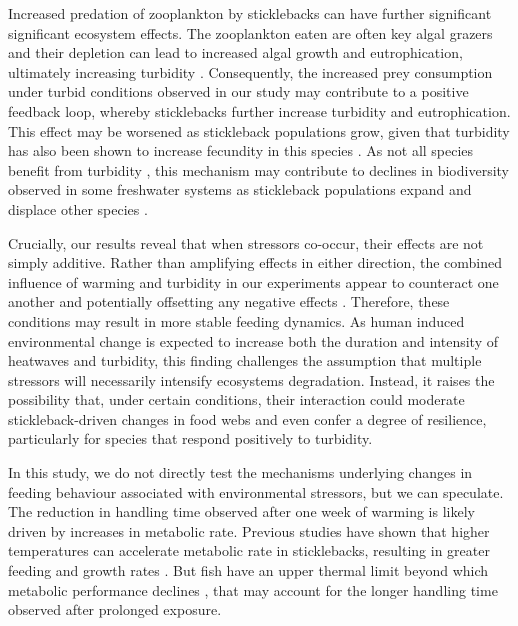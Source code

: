 \documentclass[ASNA,twocolumn]{USG} %
\begin{document}
Increased predation of zooplankton by sticklebacks can have further significant significant ecosystem effects. The zooplankton eaten are often key algal grazers and their depletion can lead to increased algal growth and eutrophication, ultimately increasing turbidity \citep{siebenCascadingEffectsPredator2011, jakobsentsImpactThreespinedStickleback2003, desrochesEcologicalEvolutionaryEffects2013, candolinInfluenceSticklebackAccumulation2016}. Consequently, the increased prey consumption under turbid conditions observed in our study may contribute to a positive feedback loop, whereby sticklebacks further increase turbidity and eutrophication. This effect may be worsened as stickleback populations grow, given that turbidity has also been shown to increase fecundity in this species \citep{saarinenMechanismsBottomupEffects2020}. As not all species benefit from turbidity \citep{rodriguesMetaanalyticalReviewTurbidity2023}, this mechanism may contribute to declines in biodiversity observed in some freshwater systems as stickleback populations expand and displace other species \citep{bretzelFeedingEcologyInvasive2021}. 

Crucially, our results reveal that when stressors co-occur, their effects are not simply additive. Rather than amplifying effects in either direction, the combined influence of warming and turbidity in our experiments appear to counteract one another and potentially offsetting any negative effects \citep{jacksonNetEffectsMultiple2016,piggottReconceptualizingSynergismAntagonism2015}. Therefore, these conditions may result in more stable feeding dynamics. As human induced environmental change is expected to increase both the duration and intensity of heatwaves and turbidity, this finding challenges the assumption that multiple stressors will necessarily intensify ecosystems degradation. Instead, it raises the possibility that, under certain conditions, their interaction could moderate stickleback-driven changes in food webs and even confer a degree of resilience, particularly for species that respond positively to turbidity. 

In this study, we do not directly test the mechanisms underlying changes in feeding behaviour associated with environmental stressors, but we can speculate. The reduction in handling time observed after one week of warming is likely driven by increases in metabolic rate. Previous studies have shown that higher temperatures can accelerate metabolic rate in sticklebacks, resulting in greater feeding and growth rates \citep{guderleyInteractionAgeThermal1994}. But fish have an upper thermal limit beyond which metabolic performance declines \citep{lefebureTemperaturedependentGrowthModel2011}, that may account for the longer handling time observed after prolonged exposure. 
\end{document}
